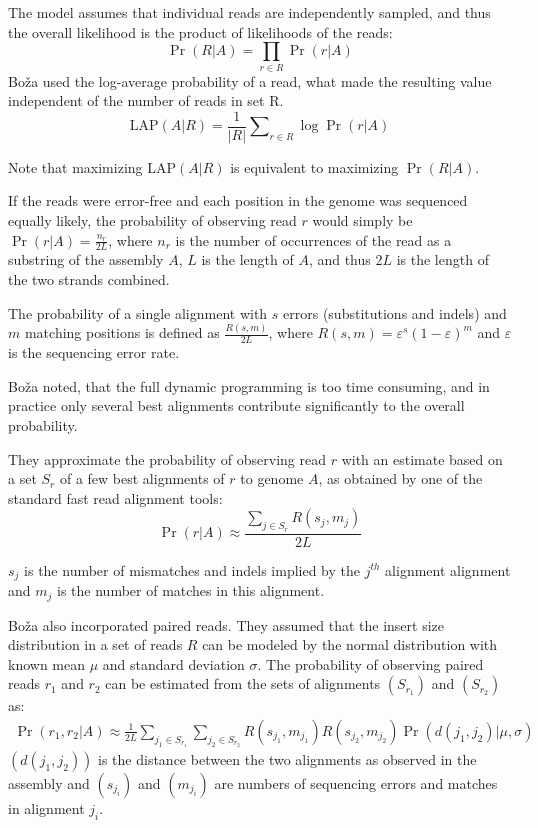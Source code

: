 The model assumes that individual reads are independently sampled, and thus the overall likelihood is the product of likelihoods of the reads: $$\Pr(R|A) = \prod _{r\in R} \Pr (r|A)$$
Boža used the log-average probability of a read, what made the resulting value independent of the number of reads in set R.
$$\text{LAP}(A|R) = \frac{1}{|R|}\sum\nolimits_{r\in R} \log \Pr (r|A)$$

Note that maximizing \(\text {LAP}(A|R)\) is equivalent to maximizing \(\Pr (R|A)\).

If the reads were error-free and each position in the genome was sequenced equally likely, 
the probability of observing read $r$ would simply be $\Pr (r|A)= \frac{n_r}{2L}$, 
where $n_r$ is the number of occurrences of the read as a substring of the assembly $A$, 
$L$ is the length of $A$, and thus $2L$ is the length of the two strands combined. 

The probability of a single alignment with $s$ errors (substitutions and indels) and $m$ matching positions is defined as $\frac{R(s,m)}{2L}$, 
where $R(s,m) = \varepsilon ^{s}(1-\varepsilon )^{m}$ and $\varepsilon$ is the sequencing error rate.

Boža noted, that the full dynamic programming is too time consuming, 
and in practice only several best alignments contribute significantly to the overall probability.

They approximate the probability of observing read $r$ with an estimate based on a set $S_r$ of a few best alignments of $r$ to genome $A$, as obtained by one of the standard fast read alignment tools:
$$\Pr (r|A)\approx \frac{\sum _{j\in S_r} R(s_j, m_j)}{2L}$$

$s_j$ is the number of mismatches and indels implied by the $j^{th}$ alignment alignment and $m_j$ is the number of matches in this alignment. 

Boža also incorporated paired reads. 
They assumed that the insert size distribution in a set of reads $R$ can be modeled by the normal distribution with known mean $\mu$ and standard deviation $\sigma$. 
The probability of observing paired reads $r_1$ and $r_2$ can be estimated from the sets of alignments $(S_{r_1})$ and $(S_{r_2})$ as:
$$\begin{aligned} \Pr (r_1, r_2|A) \approx \frac{1}{2L} \displaystyle \sum _{j_1 \in S_{r_1}} \displaystyle \sum _{j_2 \in S_{r_2}} R(s_{j_1}, m_{j_1}) R(s_{j_2}, m_{j_2}) \Pr (d(j_1, j_2)|\mu , \sigma ) \end{aligned}$$
$(d(j_1,j_2))$ is the distance between the two alignments as observed in the assembly 
and $(s_{j_i})$ and $(m_{j_i})$ are numbers of sequencing errors and matches in alignment $j_i$. 

